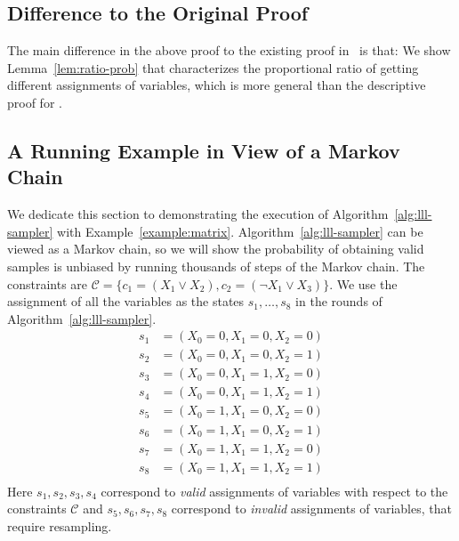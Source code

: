 \subsection{Difference to the Original Proof}
The main difference in the above proof to the existing proof in~\citep[Lemma
    7]{DBLP:journals/jacm/GuoJL19} is that: We show Lemma~\ref{lem:ratio-prob} that
characterizes the proportional ratio of getting different assignments of
variables, which is more general than the descriptive proof for \citep[Lemma
    7]{DBLP:journals/jacm/GuoJL19}.
\subsection{A Running Example in View of a Markov Chain} \label{appendix:running-example}
{We dedicate this section to demonstrating the execution of Algorithm~\ref{alg:lll-sampler} with Example~\ref{example:matrix}. Algorithm~\ref{alg:lll-sampler} can be viewed as a Markov chain, so  we will show the probability of obtaining valid samples is unbiased by running thousands of steps of the Markov chain. }
The constraints are $\mathcal{C}=\{c_1=(X_1\vee X_2), c_2=(\neg X_1 \vee X_3)\}$. We use the assignment of all the variables as the states $s_1,\ldots, s_8$ in the rounds of Algorithm~\ref{alg:lll-sampler}.
\begin{equation}
    \begin{aligned}
        s_1 & =(X_0=0,X_1=0,X_2=0) \\
        s_2 & =(X_0=0,X_1=0,X_2=1) \\
        s_3 & =(X_0=0,X_1=1,X_2=0) \\
        s_4 & =(X_0=0,X_1=1,X_2=1) \\
        s_5 & =(X_0=1,X_1=0,X_2=0) \\
        s_6 & =(X_0=1,X_1=0,X_2=1) \\
        s_7 & =(X_0=1,X_1=1,X_2=0) \\
        s_8 & =(X_0=1,X_1=1,X_2=1) \\
    \end{aligned}
\end{equation}
Here $s_1,s_2,s_3,s_4$ correspond to \textit{valid} assignments of variables with respect to the constraints $\mathcal{C}$ and $s_5,s_6,s_7,s_8$ correspond to \textit{invalid} assignments of variables, that require resampling.

